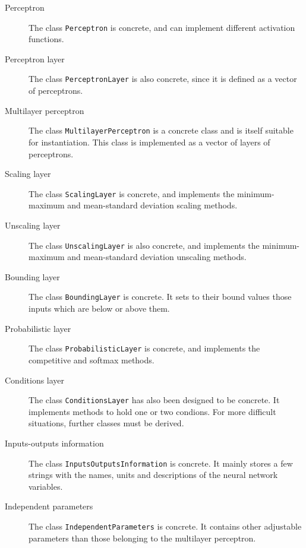 \begin{description}

\item[Perceptron] The class \lstinline"Perceptron" is concrete,
and can implement different activation functions. 

\item[Perceptron layer] The class \lstinline"PerceptronLayer" is also concrete,
since it is defined as a vector of perceptrons.

\item[Multilayer perceptron] The class \lstinline"MultilayerPerceptron" is a concrete class and is
itself suitable for instantiation. This class is implemented as a vector of layers of perceptrons. 

\item[Scaling layer] The class \lstinline"ScalingLayer" is concrete, and implements the minimum-maximum and mean-standard deviation scaling methods.

\item[Unscaling layer] The class \lstinline"UnscalingLayer" is also concrete, and implements the minimum-maximum and mean-standard deviation unscaling methods.

\item[Bounding layer] The class \lstinline"BoundingLayer" is concrete. It sets to their bound values those inputs which are below or above them. 

\item[Probabilistic layer] The class \lstinline"ProbabilisticLayer" is concrete, and implements the competitive and softmax methods.

\item[Conditions layer] The class \lstinline"ConditionsLayer" has also been designed to be concrete. It implements methods to hold one or two condions. For more difficult situations, further classes must be derived. 

\item[Inputs-outputs information] The class \lstinline"InputsOutputsInformation" is concrete. It mainly stores a few strings with the names, units and descriptions of the neural network variables. 

\item[Independent parameters] The class \lstinline"IndependentParameters" is concrete. It contains other adjustable parameters 
than those belonging to the multilayer perceptron. 

\end{description}

